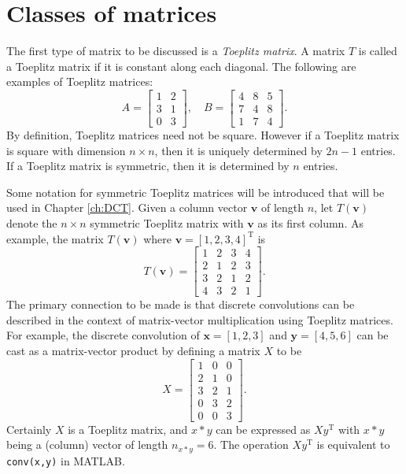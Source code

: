 \documentclass[12pt,notitlepage]{report}
\newcommand{\trans}{\mathrm{T}}	%
\begin{document}
\section{Classes of matrices} \label{sec:Classes of matrices}
The first type of matrix to be discussed is a \textit{Toeplitz matrix}. A matrix $T$ is called a Toeplitz matrix if it is constant along each diagonal. The following are examples of Toeplitz matrices:
\[A = \begin{bmatrix}
1 & 2 \\
3 & 1 \\
0 & 3
\end{bmatrix}, \quad 
B = \begin{bmatrix}
4 & 8 & 5 \\
7 & 4 & 8 \\
1 & 7 & 4
\end{bmatrix}.\]
By definition, Toeplitz matrices need not be square. However if a Toeplitz matrix is square with dimension $n \times n$, then it is uniquely determined by $2n-1$ entries. If a Toeplitz matrix is symmetric, then it is determined by $n$ entries. \par
Some notation for symmetric Toeplitz matrices will be introduced that will be used in Chapter \ref{ch:DCT}. Given a column vector $\mathbf{v}$ of length $n$, let $T(\mathbf{v})$ denote the $n \times n$ symmetric Toeplitz matrix with $\mathbf{v}$ as its first column. As example, the matrix $T(\mathbf{v})$ where $\mathbf{v} = [1,2,3,4]^\trans$ is
\[T(\mathbf{v}) = \begin{bmatrix}
1 & 2 & 3 & 4 \\
2 & 1 & 2 & 3 \\
3 & 2 & 1 & 2 \\
4 & 3 & 2 & 1 
\end{bmatrix}.\] 
The primary connection to be made is that discrete convolutions can be described in the context of matrix-vector multiplication using Toeplitz matrices. For example, the discrete convolution of $\mathbf{x} = [1,2,3]$ and $\mathbf{y} = [4,5,6]$ can be cast as a matrix-vector product by defining a matrix $X$ to be
\[X = \begin{bmatrix}
1 & 0 & 0  \\
2 & 1 & 0 \\
3 & 2 & 1 \\
0 & 3 & 2 \\
0 & 0 & 3 
\end{bmatrix}.\]
Certainly $X$ is a Toeplitz matrix, and $x*y$ can be expressed as $Xy^\trans$ with $x*y$ being a (column) vector of length $n_{x*y} = 6$. The operation $Xy^\trans$ is equivalent to \texttt{conv(x,y)} in MATLAB. \par 
\end{document}
